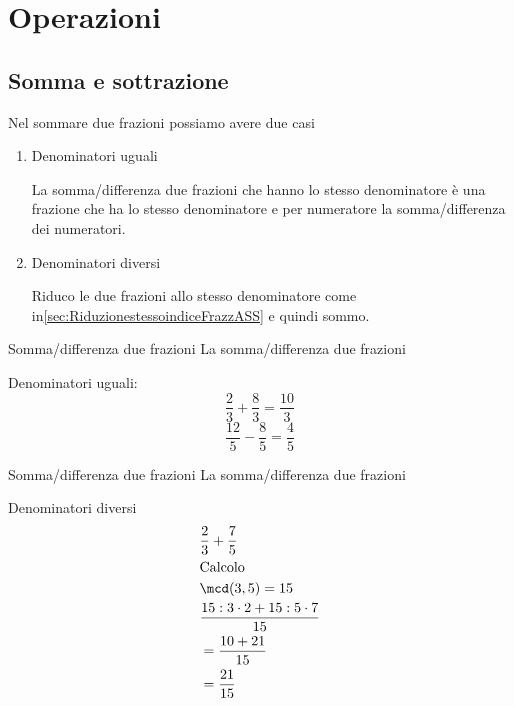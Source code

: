\section{Operazioni}
	\label{sec:OperazioniASS}
	\subsection{Somma e sottrazione}
	\label{ssec:SommaesottrazioniASS}
	Nel sommare due frazioni possiamo avere due casi 
	\begin{enumerate}
		\item Denominatori uguali
		
		La somma/differenza due frazioni che hanno lo stesso denominatore è una frazione che ha lo stesso denominatore e per numeratore la somma/differenza dei numeratori. 
		\item Denominatori diversi
		
		Riduco le due frazioni allo stesso denominatore come in\nobs\vref{sec:RiduzionestessoindiceFrazzASS} e quindi sommo.
	\end{enumerate}
	\begin{esempiot}{Somma/differenza due frazioni}{}
	La somma/differenza due frazioni
	\end{esempiot}
		Denominatori uguali:
		\[\dfrac{2}{3}+\dfrac{8}{3}=\dfrac{10}{3}\]  \[\dfrac{12}{5}-\dfrac{8}{5}=\dfrac{4}{5}\]
	\begin{esempiot}{Somma/differenza due frazioni}{}
	La somma/differenza due frazioni
	\end{esempiot}
		Denominatori diversi
		\begin{align*}
			&\dfrac{2}{3}+\dfrac{7}{5}\\
			&\text{Calcolo}\\
			&\mcd(3,5)=15\\
			&\dfrac{15:3\cdot 2+15:5\cdot 7}{15}\\
			&=\dfrac{10+21}{15}\\
			&=\dfrac{21}{15}
			\end{align*}
	\begin{table}
		\centering
		
		\caption{Somma di frazioni}
		\label{tab:sommadifrazioniASS}
	\end{table}
